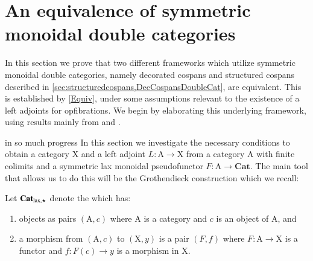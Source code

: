 \documentclass{amsart}
\begin{document}
\section{An equivalence of symmetric monoidal double categories} \label{EquivDoubleCats}
In this section we prove that two different frameworks which utilize symmetric monoidal double categories, namely decorated cospans and structured cospans described in \cref{sec:structuredcospans,DecCospansDoubleCat}, are equivalent. This is established by \cref{Equiv}, under some assumptions relevant to the existence of a left adjoints for opfibrations. We begin by elaborating this underlying framework, using results mainly from \cite{CV} and \cite{MV}.


{\chris in so much progress}
In this section we investigate the necessary conditions to obtain a category $\mathrm{X}$ and a left adjoint $L \colon \mathrm{A} \to \mathrm{X}$ from a category $\mathrm{A}$ with finite colimits and a symmetric lax monoidal pseudofunctor $F \colon \mathrm{A} \to \mathbf{Cat}$. The main tool that allows us to do this will be the Grothendieck construction which we recall:

\begin{defn}
Let $\mathbf{Cat}_{\textnormal{lax},\star}$ denote the  which has:
\begin{enumerate}
\item{objects as pairs $(\mathrm{A},c)$ where $\mathrm{A}$ is a category and $c$ is an object of $\mathrm{A}$, and}
\item{a morphism from $(\mathrm{A},c)$ to $(\mathrm{X},y)$ is a pair $(F,f)$ where $F \colon \mathrm{A} \to \mathrm{X}$ is a functor and $f \colon F(c) \to y$ is a morphism in $\mathrm{X}$.}
\end{enumerate}
\end{defn}
\end{document}
